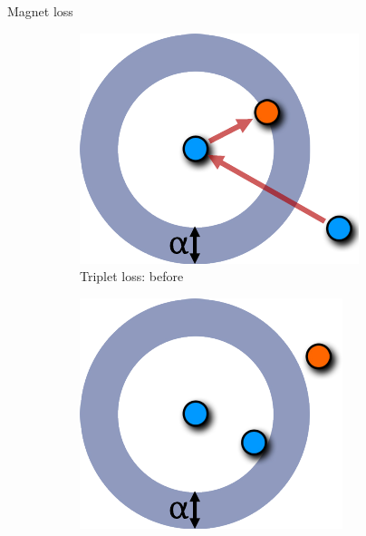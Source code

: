 \documentclass[10pt]{beamer}
\begin{document}
\begin{frame}{Magnet loss}
	\begin{figure}[h]
		\centering
		\begin{subfigure}[b]{0.18\textwidth}
			\centering
			\includegraphics[width=\textwidth]{images/triplet-magnet-difference/triplet_before.pdf}
			\caption{Triplet loss: before}
		\end{subfigure}
		\hfill
		\begin{subfigure}[b]{0.18\textwidth}
			\centering
			\includegraphics[width=\textwidth]{images/triplet-magnet-difference/triplet_after.pdf}

\end{subfigure}
\end{figure}
\end{frame}
\end{document}
